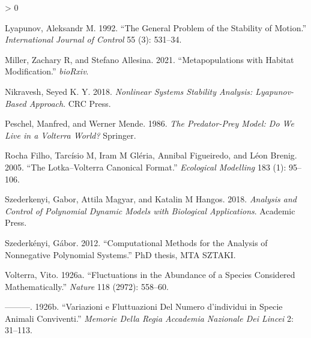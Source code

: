\documentclass{article}
\newlength{\cslhangindent}
\newenvironment{CSLReferences}[2] %
 {%
  \setlength{\parindent}{0pt}
  \ifodd #1 \everypar{\setlength{\hangindent}{\cslhangindent}}\ignorespaces\fi
  \ifnum #2 > 0
  \setlength{\parskip}{#2\baselineskip}
  \fi
 }%
 {}
\begin{document}
\begin{CSLReferences}{1}{0}
\leavevmode\hypertarget{ref-lyapunov1992general}{}%
Lyapunov, Aleksandr M. 1992. {``The General Problem of the Stability of
Motion.''} \emph{International Journal of Control} 55 (3): 531--34.

\leavevmode\hypertarget{ref-miller2021metapopulations}{}%
Miller, Zachary R, and Stefano Allesina. 2021. {``Metapopulations with
Habitat Modification.''} \emph{bioRxiv}.

\leavevmode\hypertarget{ref-nikravesh2018nonlinear}{}%
Nikravesh, Seyed K. Y. 2018. \emph{Nonlinear Systems Stability Analysis:
Lyapunov-Based Approach}. CRC Press.

\leavevmode\hypertarget{ref-peschel1986predator}{}%
Peschel, Manfred, and Werner Mende. 1986. \emph{The Predator-Prey Model:
Do We Live in a Volterra World?} Springer.

\leavevmode\hypertarget{ref-rocha2005lotka}{}%
Rocha Filho, Tarcísio M, Iram M Gléria, Annibal Figueiredo, and Léon
Brenig. 2005. {``The Lotka--Volterra Canonical Format.''}
\emph{Ecological Modelling} 183 (1): 95--106.

\leavevmode\hypertarget{ref-szederkenyi2018analysis}{}%
Szederkenyi, Gabor, Attila Magyar, and Katalin M Hangos. 2018.
\emph{Analysis and Control of Polynomial Dynamic Models with Biological
Applications}. Academic Press.

\leavevmode\hypertarget{ref-szederkenyi2012computational}{}%
Szederkényi, Gábor. 2012. {``Computational Methods for the Analysis of
Nonnegative Polynomial Systems.''} PhD thesis, MTA SZTAKI.

\leavevmode\hypertarget{ref-volterra1926fluctuations}{}%
Volterra, Vito. 1926a. {``Fluctuations in the Abundance of a Species
Considered Mathematically.''} \emph{Nature} 118 (2972): 558--60.

\leavevmode\hypertarget{ref-volterra1926variazioni}{}%
---------. 1926b. {``Variazioni e Fluttuazioni Del Numero d'individui in
Specie Animali Conviventi.''} \emph{Memorie Della Regia Accademia
Nazionale Dei Lincei} 2: 31--113.

\end{CSLReferences}



\end{document}
